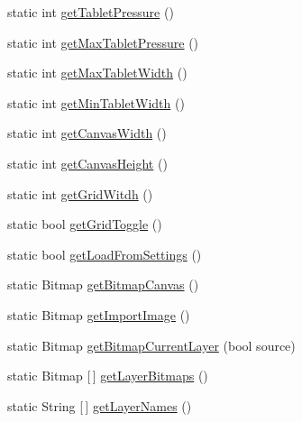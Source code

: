 \begin{DoxyCompactItemize}
\item 
static int \mbox{\hyperlink{class_paint___program_1_1_shared_settings_aa292a53d81c4468027e709112251145c}{get\+Tablet\+Pressure}} ()
\item 
static int \mbox{\hyperlink{class_paint___program_1_1_shared_settings_a3e0788a0352a8c6452f453200dddb0f5}{get\+Max\+Tablet\+Pressure}} ()
\item 
static int \mbox{\hyperlink{class_paint___program_1_1_shared_settings_a5ecf4cafdd6eaf29bbdb6f1c46e979a5}{get\+Max\+Tablet\+Width}} ()
\item 
static int \mbox{\hyperlink{class_paint___program_1_1_shared_settings_acc7f3b38125afd3a08cbd796ad459092}{get\+Min\+Tablet\+Width}} ()
\item 
static int \mbox{\hyperlink{class_paint___program_1_1_shared_settings_ad899bf73dd656f16264cd5da259107ad}{get\+Canvas\+Width}} ()
\item 
static int \mbox{\hyperlink{class_paint___program_1_1_shared_settings_ad1146205622cfdd83c8b70d90d785f1b}{get\+Canvas\+Height}} ()
\item 
static int \mbox{\hyperlink{class_paint___program_1_1_shared_settings_a6498a364a11a938a7b08814431a8b3fa}{get\+Grid\+Witdh}} ()
\item 
static bool \mbox{\hyperlink{class_paint___program_1_1_shared_settings_abe1d353efcf1c05157ed2f1220f37bab}{get\+Grid\+Toggle}} ()
\item 
static bool \mbox{\hyperlink{class_paint___program_1_1_shared_settings_adcee4b0bd2f49f03abe987b2a9367ab7}{get\+Load\+From\+Settings}} ()
\item 
static Bitmap \mbox{\hyperlink{class_paint___program_1_1_shared_settings_ae730175917633c0f69ff43dacb3d0f7d}{get\+Bitmap\+Canvas}} ()
\item 
static Bitmap \mbox{\hyperlink{class_paint___program_1_1_shared_settings_a6c75b519d5c834234bbe5038f812b4d1}{get\+Import\+Image}} ()
\item 
static Bitmap \mbox{\hyperlink{class_paint___program_1_1_shared_settings_a13e2670ccbc67f1bffef4e71f49a73af}{get\+Bitmap\+Current\+Layer}} (bool source)
\item 
static Bitmap \mbox{[}$\,$\mbox{]} \mbox{\hyperlink{class_paint___program_1_1_shared_settings_a74ec4844063ebdc962492bc2a2dd3fcc}{get\+Layer\+Bitmaps}} ()
\item 
static String \mbox{[}$\,$\mbox{]} \mbox{\hyperlink{class_paint___program_1_1_shared_settings_a3433f10c2167c599a1d0f908efc5e62a}{get\+Layer\+Names}} ()
\item 

\end{DoxyCompactItemize}
